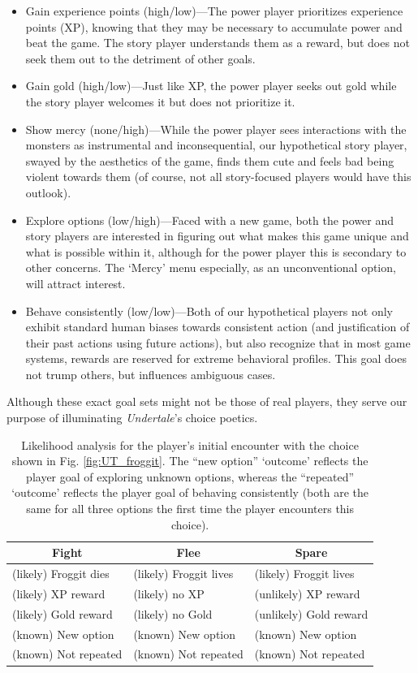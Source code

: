 \documentclass[arts,article,submit,moreauthors,pdftex,10pt,a4paper]{Definitions/mdpi}
\begin{document}
\begin{itemize}
  \item Gain experience points (high/low)---The power player prioritizes experience points (XP), knowing that they may be necessary to accumulate power and beat the game. The story player understands them as a reward, but does not seek them out to the detriment of other goals.
  \item Gain gold (high/low)---Just like XP, the power player seeks out gold while the story player welcomes it but does not prioritize it.
  \item Show mercy (none/high)---While the power player sees interactions with the monsters as instrumental and inconsequential, our hypothetical story player, swayed by the aesthetics of the game, finds them cute and feels bad being violent towards them (of course, not all story-focused players would have this outlook).
  \item Explore options (low/high)---Faced with a new game, both the power and story players are interested in figuring out what makes this game unique and what is possible within it, although for the power player this is secondary to other concerns. The `Mercy' menu especially, as an unconventional option, will attract interest.
  \item Behave consistently (low/low)---Both of our hypothetical players not only exhibit standard human biases towards consistent action (and justification of their past actions using future actions), but also recognize that in most game systems, rewards are reserved for extreme behavioral profiles. This goal does not trump others, but influences ambiguous cases.
\end{itemize}
Although these exact goal sets might not be those of real players, they serve our purpose of illuminating \emph{Undertale}'s choice poetics.

\begin{table}[H]
\centering
\begin{tabular}{l l l}
  \toprule
 \multicolumn{1}{c}{\textbf{Fight}} & \multicolumn{1}{c}{\textbf{Flee}} & \multicolumn{1}{c}{\textbf{Spare}} \\
  \midrule
 (likely) Froggit dies & (likely) Froggit lives & (likely) Froggit lives \\
 (likely) XP reward & (likely) no XP & (unlikely) XP reward \\
 (likely) Gold reward & (likely) no Gold & (unlikely) Gold reward \\
 (known) New option & (known) New option & (known) New option \\
 (known) Not repeated & (known) Not repeated & (known) Not repeated \\
  \bottomrule
\end{tabular}
  \caption[\emph{Undertale} likelihood analysis]{Likelihood analysis for the player's initial encounter with the choice shown in Fig. \ref{fig:UT_froggit}. The ``new option'' `outcome' reflects the player goal of exploring unknown options, whereas the ``repeated'' `outcome' reflects the player goal of behaving consistently (both are the same for all three options the first time the player encounters this choice).}
\label{tab:UT_likelihoods}
\end{table}
\end{document}
